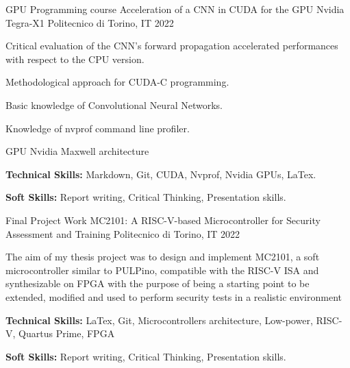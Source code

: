 \begin{cventries}
  \cventry
    {GPU Programming course} %
    {Acceleration of a CNN in CUDA for the GPU Nvidia Tegra-X1} %
    {Politecnico di Torino, IT} %
    {2022} %
    {
      \begin{cvitems} %
        \item {Critical evaluation of the CNN's forward propagation accelerated performances with respect to the CPU version.}
        \item {Methodological approach for CUDA-C programming.}
        \item {Basic knowledge of Convolutional Neural Networks.}
        \item {Knowledge of nvprof command line profiler.}
        \item {GPU Nvidia Maxwell architecture}
        \item {\textbf{Technical Skills:} Markdown, Git, CUDA, Nvprof, Nvidia GPUs, LaTex.}
        \item {\textbf{Soft Skills:} Report writing, Critical Thinking, Presentation skills.}
      \end{cvitems}
    }

  \cventry
    {Final Project Work} %
    {MC2101: A RISC-V-based Microcontroller for Security Assessment and Training} %
    {Politecnico di Torino, IT} %
    {2022} %
    {
      \begin{cvitems} %
        \item {The aim of my thesis project was to design and implement MC2101, a soft microcontroller similar to PULPino, compatible with the RISC-V ISA and synthesizable on FPGA with the purpose of being a starting point to be extended, modified and used to perform security tests in a realistic environment}
        \item {\textbf{Technical Skills:} LaTex, Git, Microcontrollers architecture, Low-power, RISC-V, Quartus Prime, FPGA}
        \item {\textbf{Soft Skills:} Report writing, Critical Thinking, Presentation skills.}
      \end{cvitems}
    }

\end{cventries}
